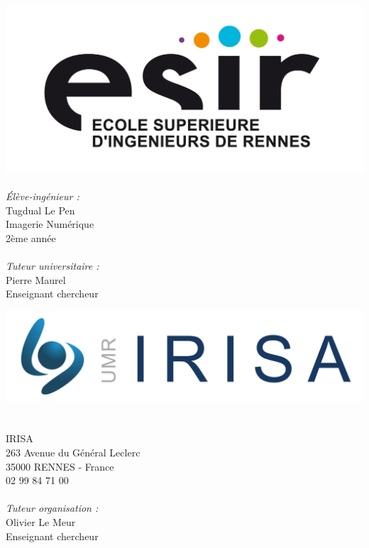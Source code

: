 \begin{titlepage}
  \begin{center}

    \begin{minipage}{0.45\textwidth}
      \begin{flushleft} \large
        \includegraphics[width=0.9\columnwidth]{datas/logo_esir.jpg}~\\
        \emph{Élève-ingénieur :}\\
        Tugdual Le Pen\\
        Imagerie Numérique\\
        2ème année\\
        ~\\
        \emph{Tuteur universitaire :}\\
        Pierre Maurel\\
        Enseignant chercheur
      \end{flushleft}
    \end{minipage}
    \begin{minipage}{0.45\textwidth}
      \begin{flushright} \large
        \vspace{19pt}
        \includegraphics[width=0.9\columnwidth]{datas/logo_irisa.jpg}~\\~\\
        IRISA\\
        263 Avenue du Général Leclerc\\
        35000 RENNES - France\\
        02 99 84 71 00\\
        ~\\        
        \emph{Tuteur organisation :}\\
        Olivier Le Meur\\
        Enseignant chercheur\\
      \end{flushright}
    \end{minipage}


\end{center}
\end{titlepage}
